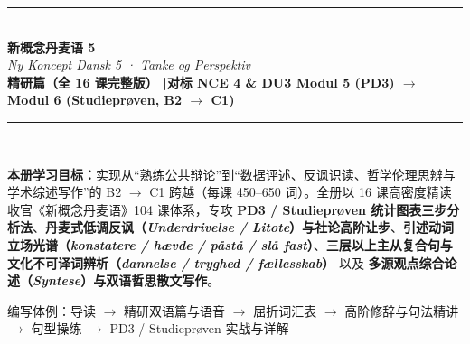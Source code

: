 \documentclass[11pt, a4paper]{ctexart}
\begin{document}
\begin{titlepage}
  \centering
  \vspace*{2.5cm}
  {\color{NCDRed}\rule{\linewidth}{2.5pt}}\\[1.2cm]
  {\fontsize{34}{40}\selectfont\bfseries\color{NCDNavy} 新概念丹麦语 5}\\[0.5cm]
  {\huge\itshape\color{NCDTeal} Ny Koncept Dansk 5 · Tanke og Perspektiv}\\[0.8cm]
  {\large\bfseries\color{NCDGray} 精研篇（全 16 课完整版） \quad|\quad 对标 NCE 4 \& DU3 Modul 5 (PD3) $\rightarrow$ Modul 6 (Studieprøven, B2 $\rightarrow$ C1)}\\[1.2cm]
  {\color{NCDRed}\rule{\linewidth}{2.5pt}}\\[2cm]

  \begin{tcolorbox}[
    colback=NCDBgBlue,
    colframe=NCDNavy,
    width=0.90\linewidth,
    arc=4pt,
    boxrule=0.8pt,
    left=14pt, right=14pt, top=12pt, bottom=12pt
  ]
    \textbf{\color{NCDNavy}本册学习目标：}实现从“熟练公共辩论”到“数据评述、反讽识读、哲学伦理思辨与学术综述写作”的 B2 $\rightarrow$ C1 跨越（每课 450--650 词）。全册以 16 课高密度精读收官《新概念丹麦语》104 课体系，专攻 \textbf{PD3 / Studieprøven 统计图表三步分析法}、\textbf{丹麦式低调反讽（\textit{Underdrivelse / Litote}）与社论高阶让步}、\textbf{引述动词立场光谱（\textit{konstatere / hævde / påstå / slå fast}）}、\textbf{三层以上主从复合句与文化不可译词辨析（\textit{dannelse / tryghed / fællesskab}）} 以及 \textbf{多源观点综合论述（\textit{Syntese}）与双语哲思散文写作}。
  \end{tcolorbox}

  \vfill
  {\large\color{NCDGray} 编写体例：导读 $\rightarrow$ 精研双语篇与语音 $\rightarrow$ 屈折词汇表 $\rightarrow$ 高阶修辞与句法精讲 $\rightarrow$ 句型操练 $\rightarrow$ PD3 / Studieprøven 实战与详解}
\end{titlepage}

\tableofcontents
\clearpage

\end{document}
